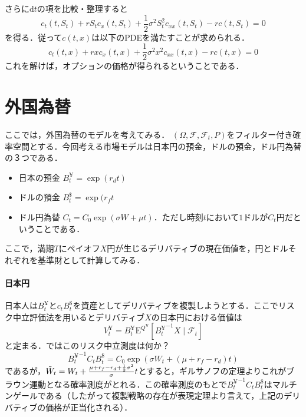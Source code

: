 \documentclass{jsarticle}
\theoremstyle{definition}
\begin{document}
さらに$\mathrm{d}t$の項を比較・整理すると
\begin{equation*}
    c_t(t, S_t) + rS_tc_x(t, S_t) + \frac{1}{2}\sigma^2 S_t^2c_{xx}(t, S_t) - rc(t, S_t) = 0
\end{equation*}
を得る．従って$c(t, x)$は以下のPDEを満たすことが求められる．
\begin{equation*}
    c_t(t, x) + rxc_x(t, x) + \frac{1}{2}\sigma^2 x^2c_{xx}(t, x) - rc(t, x) = 0
\end{equation*}
これを解けば，オプションの価格が得られるということである．

\section{外国為替}
ここでは，外国為替のモデルを考えてみる．
$(\Omega, \mathscr{F}, \mathscr{F}_t, P)$をフィルター付き確率空間とする．今回考える市場モデルは日本円の預金，ドルの預金，ドル円為替の３つである．
\begin{itemize}
    \item 日本の預金 $B_t^¥ = \exp{(r_d t)}$
    \item ドルの預金 $B_t^\$ = \exp{(r_f t}$
    \item ドル円為替 $C_t = C_0 \exp{(\sigma W + \mu t)}$．ただし時刻$t$において$1$ドルが$C_t$円だということである．
\end{itemize}
ここで，満期$T$にペイオフ$X$円が生じるデリバティブの現在価値を，円とドルそれぞれを基準財として計算してみる．
\paragraph{日本円} 日本人は$B_t^¥$と$c_t B_t^\$$を資産としてデリバティブを複製しようとする．ここでリスク中立評価法を用いるとデリバティブ$X$の日本円における価値は
$$
 V_t^¥ = B_t^¥ \mathrm{E}^{Q^¥}\left[{B_t^¥}^{-1} X \mid \mathscr{F}_t\right]
$$
と定まる．ではこのリスク中立測度は何か？
$$
    {B_t^¥}^{-1} C_t B_t^\$ = C_0 \exp{\left(\sigma W_t + (\mu + r_f - r_d) t\right)}
$$
であるが，$\Tilde{W}_t = W_t + \frac{\mu + r_f - r_d + \frac{1}{2}\sigma^2}{\sigma} t$とすると，ギルサノフの定理よりこれがブラウン運動となる確率測度がとれる．この確率測度のもとで${B_t^¥}^{-1} C_t B_t^\$$はマルチンゲールである（したがって複製戦略の存在が表現定理より言えて，上記のデリバティブの価格が正当化される）．
\end{document}
